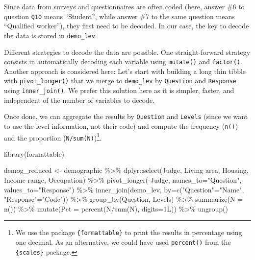 \documentclass[
]{book}
\newenvironment{Shaded}{\begin{snugshade}}{\end{snugshade}}
\newcommand{\AttributeTok}[1]{\textcolor[rgb]{0.77,0.63,0.00}{#1}}
\newcommand{\FunctionTok}[1]{\textcolor[rgb]{0.00,0.00,0.00}{#1}}
\newcommand{\NormalTok}[1]{#1}
\newcommand{\OtherTok}[1]{\textcolor[rgb]{0.56,0.35,0.01}{#1}}
\newcommand{\SpecialCharTok}[1]{\textcolor[rgb]{0.00,0.00,0.00}{#1}}
\newcommand{\StringTok}[1]{\textcolor[rgb]{0.31,0.60,0.02}{#1}}
\begin{document}
Since data from surveys and questionnaires are often coded (here, answer \#6 to question \texttt{Q10} means ``Student'', while answer \#7 to the same question means ``Qualified worker''), they first need to be decoded. In our case, the key to decode the data is stored in \texttt{demo\_lev}.

Different strategies to decode the data are possible. One straight-forward strategy consists in automatically decoding each variable using \texttt{mutate()} and \texttt{factor()}. Another approach is considered here: Let's start with building a long thin tibble with \texttt{pivot\_longer()} that we merge to \texttt{demo\_lev} by \texttt{Question} and \texttt{Response} using \texttt{inner\_join()}. We prefer this solution here as it is simpler, faster, and independent of the number of variables to decode.

Once done, we can aggregate the results by \texttt{Question} and \texttt{Levels} (since we want to use the level information, not their code) and compute the frequency (\texttt{n()}) and the proportion (\texttt{N/sum(N)})\footnote{We use the package \texttt{\{formattable\}} to print the results in percentage using one decimal. As an alternative, we could have used \texttt{percent()} from the \texttt{\{scales\}} package.}.

\begin{Shaded}
\begin{Highlighting}[]
\FunctionTok{library}\NormalTok{(formattable)}

\NormalTok{demog\_reduced }\OtherTok{\textless{}{-}}\NormalTok{ demographic }\SpecialCharTok{\%\textgreater{}\%} 
\NormalTok{  dplyr}\SpecialCharTok{::}\FunctionTok{select}\NormalTok{(Judge, }\StringTok{\textasciigrave{}}\AttributeTok{Living area}\StringTok{\textasciigrave{}}\NormalTok{, Housing, }\StringTok{\textasciigrave{}}\AttributeTok{Income range}\StringTok{\textasciigrave{}}\NormalTok{, }\StringTok{\textasciigrave{}}\AttributeTok{Occupation}\StringTok{\textasciigrave{}}\NormalTok{) }\SpecialCharTok{\%\textgreater{}\%} 
  \FunctionTok{pivot\_longer}\NormalTok{(}\SpecialCharTok{{-}}\NormalTok{Judge, }\AttributeTok{names\_to=}\StringTok{"Question"}\NormalTok{, }\AttributeTok{values\_to=}\StringTok{"Response"}\NormalTok{) }\SpecialCharTok{\%\textgreater{}\%} 
  \FunctionTok{inner\_join}\NormalTok{(demo\_lev, }\AttributeTok{by=}\FunctionTok{c}\NormalTok{(}\StringTok{"Question"}\OtherTok{=}\StringTok{"Name"}\NormalTok{, }\StringTok{"Response"}\OtherTok{=}\StringTok{"Code"}\NormalTok{)) }\SpecialCharTok{\%\textgreater{}\%} 
  \FunctionTok{group\_by}\NormalTok{(Question, Levels) }\SpecialCharTok{\%\textgreater{}\%} 
  \FunctionTok{summarize}\NormalTok{(}\AttributeTok{N =} \FunctionTok{n}\NormalTok{()) }\SpecialCharTok{\%\textgreater{}\%} 
  \FunctionTok{mutate}\NormalTok{(}\AttributeTok{Pct =} \FunctionTok{percent}\NormalTok{(N}\SpecialCharTok{/}\FunctionTok{sum}\NormalTok{(N), }\AttributeTok{digits=}\NormalTok{1L)) }\SpecialCharTok{\%\textgreater{}\%} 
  \FunctionTok{ungroup}\NormalTok{()}
\end{Highlighting}
\end{Shaded}
\end{document}
